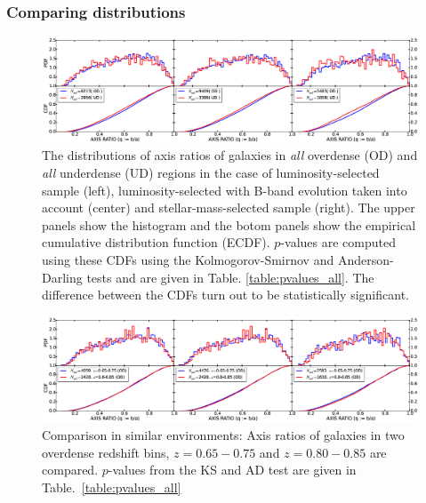 \documentclass[twocolumn,useAMS,usenatbib]{mn2e}
\begin{document}
\subsubsection{Comparing distributions}
\begin{figure}
 \centering
 \includegraphics[width=2.3\columnwidth]{axis_ratio_all}
 \caption{The distributions of axis ratios of galaxies in \emph{all} overdense (OD) and \emph{all} underdense (UD) regions in the case of luminosity-selected sample (left), luminosity-selected with B-band evolution taken into account (center) and stellar-mass-selected sample (right). The upper panels show the histogram
 and the botom panels show the empirical cumulative distribution function (ECDF). $p$-values are computed using these CDFs using the Kolmogorov-Smirnov and Anderson-Darling tests and are given in Table. \ref{table:pvalues_all}. The difference between the CDFs turn out to be statistically significant.}
 \label{fig:axisratio_all}
\end{figure}

\begin{figure}
 \centering
 \includegraphics[width=2.3\columnwidth]{axis_ratio_odod}
 \caption{Comparison in similar environments: Axis ratios of galaxies in two overdense redshift bins, $z=0.65-0.75$ and $z=0.80-0.85$ are compared. $p$-values from the KS and AD test are given in Table.~\ref{table:pvalues_all}}
 \label{fig:axisratio_similar}
\end{figure}
\end{document}
